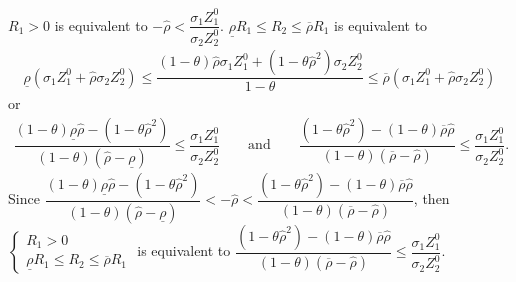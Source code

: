 \documentclass[10pt]{article}
\begin{document}
$ R_1 > 0 $ is equivalent to $ - {\hat \rho} < \dfrac{\sigma_1 Z_1^0}{\sigma_2 Z_2^0} $.
$ \underline{\rho} R_1 \leqslant R_2 \leqslant \overline{\rho} R_1 $ is equivalent to 
\begin{eqnarray*}
\underline{\rho} (\sigma_1 Z_1^0 + {\hat \rho} \sigma_2 Z_2^0) \leqslant \dfrac{(1 - \theta) {\hat \rho} \sigma_1 Z_1^0 + (1 - \theta {\hat \rho}^2) \sigma_2 Z_2^0}{1 - \theta} \leqslant \overline{\rho} (\sigma_1 Z_1^0 + {\hat \rho} \sigma_2 Z_2^0)
\end{eqnarray*} 
or
\begin{eqnarray*}
\dfrac{(1 - \theta) \underline{\rho} {\hat \rho} - (1 - \theta {\hat \rho}^2)}{(1 - \theta) ({\hat \rho} - \underline{\rho})} \leqslant \dfrac{\sigma_1 Z_1^0}{\sigma_2 Z_2^0} \qquad \text{and} \qquad \dfrac{(1 - \theta {\hat \rho}^2) - (1 - \theta) \overline{\rho} {\hat \rho}}{(1 - \theta) (\overline{\rho} - {\hat \rho})} \leqslant \dfrac{\sigma_1 Z_1^0}{\sigma_2 Z_2^0}.
\end{eqnarray*}
Since $ \dfrac{(1 - \theta) \underline{\rho} {\hat \rho} - (1 - \theta {\hat \rho}^2)}{(1 - \theta) ({\hat \rho} - \underline{\rho})} < - {\hat \rho} < \dfrac{(1 - \theta {\hat \rho}^2) - (1 - \theta) \overline{\rho} {\hat \rho}}{(1 - \theta) (\overline{\rho} - {\hat \rho})} $, then $ \left\{ \begin{matrix} R_1 > 0 \\ \underline{\rho} R_1 \leqslant R_2 \leqslant \overline{\rho} R_1 \end{matrix} \right. $ is equivalent to $ \dfrac{(1 - \theta {\hat \rho}^2) - (1 - \theta) \overline{\rho} {\hat \rho}}{(1 - \theta) (\overline{\rho} - {\hat \rho})} \leqslant \dfrac{\sigma_1 Z_1^0}{\sigma_2 Z_2^0} $.
\end{document}
